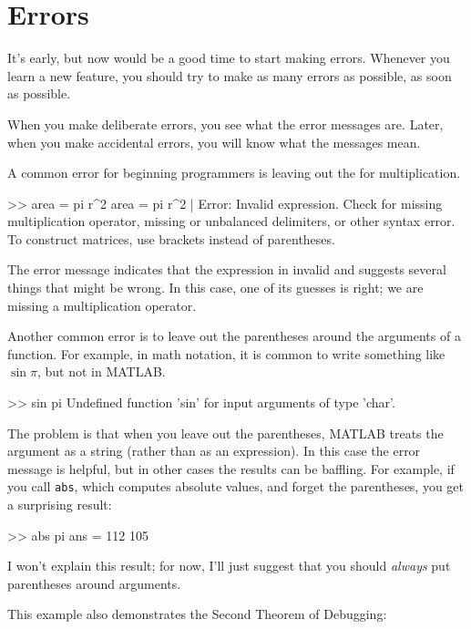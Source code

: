 \documentclass[
]{book}
\numberwithin{Answer}{chapter}
\numberwithin{Exercise}{chapter}
\begin{document}
\section{Errors}

It's early, but now would be a good time to start making errors.
Whenever you learn a new feature, you should try to make as many errors as possible, as soon as possible.

When you make deliberate errors, you see what the error messages are.
Later, when you make accidental errors, you will know what the messages mean.

A common error for beginning programmers is leaving out the {\tt *}
for multiplication.

\begin{code}
>> area = pi r^2
 area = pi r^2
           |
Error: Invalid expression. Check for missing multiplication operator, 
missing or unbalanced delimiters, or other syntax error.
To construct matrices, use brackets instead of parentheses.
\end{code}

The error message indicates that the expression in invalid and suggests several things that might be wrong.  In this case, one of its guesses is right; we are missing a multiplication operator.

Another common error is to leave out the parentheses around the
arguments of a function.  For example, in math notation, it is common
to write something like $\sin \pi$, but not in MATLAB.

\begin{code}
>> sin pi
Undefined function 'sin' for input arguments of type 'char'.
\end{code}

The problem is that when you leave out the parentheses, MATLAB treats
the argument as a string (rather than as an expression).
In this case the error message is helpful, but in other cases the results can be baffling.
For example, if you call {\tt abs}, which computes absolute values, and forget the parentheses, you get a surprising result:

\begin{code}
>> abs pi
ans =  112   105
\end{code}

I won't explain this result; for now, I'll just suggest that you should {\em always} put parentheses around arguments.

This example also demonstrates the Second Theorem of Debugging:
\end{document}
